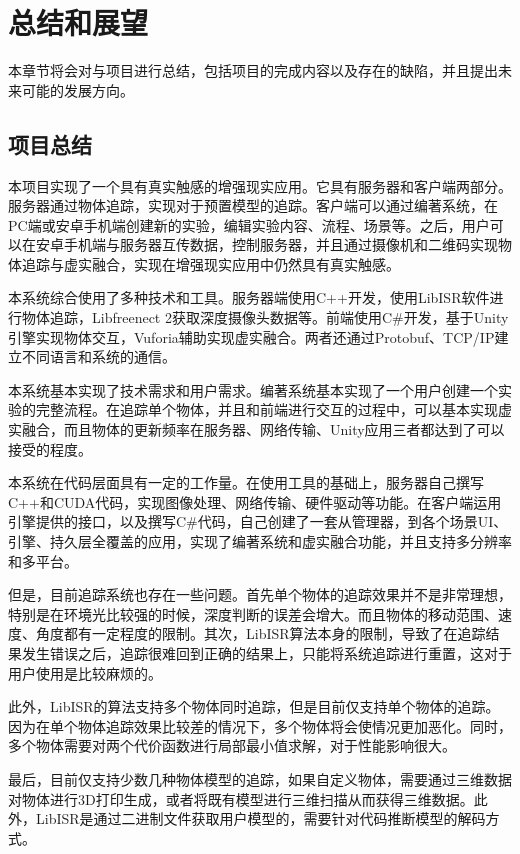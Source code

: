 \chapter{总结和展望}
\label{conclude}
本章节将会对与项目进行总结，包括项目的完成内容以及存在的缺陷，并且提出未来可能的发展方向。

\section{项目总结}
本项目实现了一个具有真实触感的增强现实应用。它具有服务器和客户端两部分。服务器通过物体追踪，实现对于预置模型的追踪。客户端可以通过编著系统，在PC端或安卓手机端创建新的实验，编辑实验内容、流程、场景等。之后，用户可以在安卓手机端与服务器互传数据，控制服务器，并且通过摄像机和二维码实现物体追踪与虚实融合，实现在增强现实应用中仍然具有真实触感。

本系统综合使用了多种技术和工具。服务器端使用C++开发，使用LibISR软件进行物体追踪，Libfreenect 2获取深度摄像头数据等。前端使用C\#开发，基于Unity引擎实现物体交互，Vuforia辅助实现虚实融合。两者还通过Protobuf、TCP/IP建立不同语言和系统的通信。

本系统基本实现了技术需求和用户需求。编著系统基本实现了一个用户创建一个实验的完整流程。在追踪单个物体，并且和前端进行交互的过程中，可以基本实现虚实融合，而且物体的更新频率在服务器、网络传输、Unity应用三者都达到了可以接受的程度。

本系统在代码层面具有一定的工作量。在使用工具的基础上，服务器自己撰写C++和CUDA代码，实现图像处理、网络传输、硬件驱动等功能。在客户端运用引擎提供的接口，以及撰写C\#代码，自己创建了一套从管理器，到各个场景UI、引擎、持久层全覆盖的应用，实现了编著系统和虚实融合功能，并且支持多分辨率和多平台。

但是，目前追踪系统也存在一些问题。首先单个物体的追踪效果并不是非常理想，特别是在环境光比较强的时候，深度判断的误差会增大。而且物体的移动范围、速度、角度都有一定程度的限制。其次，LibISR算法本身的限制，导致了在追踪结果发生错误之后，追踪很难回到正确的结果上，只能将系统追踪进行重置，这对于用户使用是比较麻烦的。

此外，LibISR的算法支持多个物体同时追踪，但是目前仅支持单个物体的追踪。因为在单个物体追踪效果比较差的情况下，多个物体将会使情况更加恶化。同时，多个物体需要对两个代价函数进行局部最小值求解，对于性能影响很大。

最后，目前仅支持少数几种物体模型的追踪，如果自定义物体，需要通过三维数据对物体进行3D打印生成，或者将既有模型进行三维扫描从而获得三维数据。此外，LibISR是通过二进制文件获取用户模型的，需要针对代码推断模型的解码方式。

